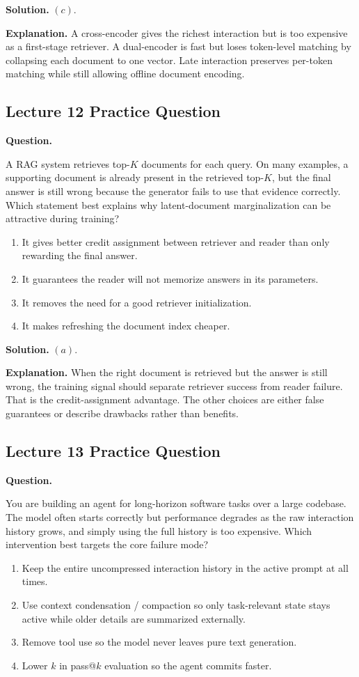 \documentclass[10pt]{article}
\begin{document}
\textbf{Solution.} \((c)\).

\textbf{Explanation.} A cross-encoder gives the richest interaction but is too expensive as a first-stage retriever. A dual-encoder is fast but loses token-level matching by collapsing each document to one vector. Late interaction preserves per-token matching while still allowing offline document encoding.

\subsection*{Lecture 12 Practice Question}
\textbf{Question.}

A RAG system retrieves top-\(K\) documents for each query. On many examples, a supporting
document is already present in the retrieved top-\(K\), but the final answer is still wrong because
the generator fails to use that evidence correctly. Which statement best explains why latent-document
marginalization can be attractive during training?
\begin{enumerate}
\item[(a)] It gives better credit assignment between retriever and reader than only rewarding the final answer.
\item[(b)] It guarantees the reader will not memorize answers in its parameters.
\item[(c)] It removes the need for a good retriever initialization.
\item[(d)] It makes refreshing the document index cheaper.
\end{enumerate}

\textbf{Solution.} \((a)\).

\textbf{Explanation.} When the right document is retrieved but the answer is still wrong, the training signal should separate retriever success from reader failure. That is the credit-assignment advantage. The other choices are either false guarantees or describe drawbacks rather than benefits.

\subsection*{Lecture 13 Practice Question}
\textbf{Question.}

You are building an agent for long-horizon software tasks over a large codebase. The model often
starts correctly but performance degrades as the raw interaction history grows, and simply using the
full history is too expensive. Which intervention best targets the core failure mode?
\begin{enumerate}
\item[(a)] Keep the entire uncompressed interaction history in the active prompt at all times.
\item[(b)] Use context condensation / compaction so only task-relevant state stays active while older details are summarized externally.
\item[(c)] Remove tool use so the model never leaves pure text generation.
\item[(d)] Lower \(k\) in pass@\(k\) evaluation so the agent commits faster.
\end{enumerate}
\end{document}
